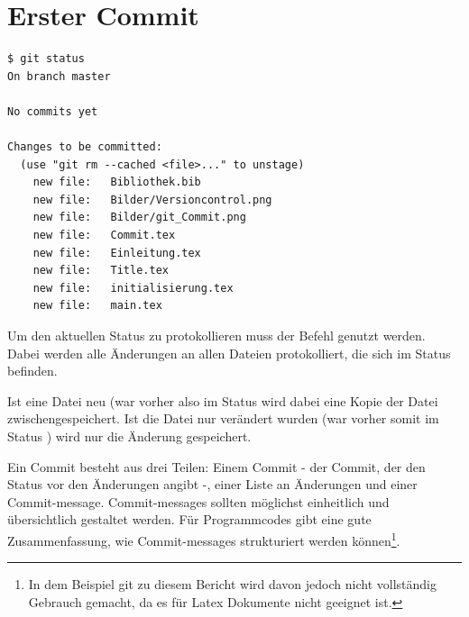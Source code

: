 \section{Erster Commit}
\begin{lstlisting}
$ git status
On branch master

No commits yet

Changes to be committed:
  (use "git rm --cached <file>..." to unstage)
	new file:   Bibliothek.bib
	new file:   Bilder/Versioncontrol.png
	new file:   Bilder/git_Commit.png
	new file:   Commit.tex
	new file:   Einleitung.tex
	new file:   Title.tex
	new file:   initialisierung.tex
	new file:   main.tex

\end{lstlisting}
Um den aktuellen Status zu protokollieren muss der Befehl  genutzt werden. Dabei werden alle Änderungen an allen Dateien protokolliert, die sich im Status  befinden.

Ist eine Datei neu (war vorher also im Status  wird dabei eine Kopie der Datei zwischengespeichert. Ist die Datei nur verändert wurden (war vorher somit im Status ) wird nur die Änderung gespeichert.

Ein Commit besteht aus drei Teilen: Einem  Commit - der Commit, der den Status vor den Änderungen angibt -, einer Liste an Änderungen und einer Commit-message. Commit-messages sollten möglichst einheitlich und übersichtlich gestaltet werden. Für Programmcodes gibt \cite{conv-Commit} eine gute Zusammenfassung, wie Commit-messages strukturiert werden können\footnote{In dem Beispiel git zu diesem Bericht wird davon jedoch nicht vollständig Gebrauch gemacht, da es für Latex Dokumente nicht geeignet ist.}.

